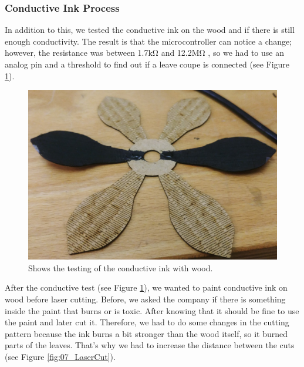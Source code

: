 \documentclass[04.3_buildingProcess.tex]{subfiles}
\begin{document}
    \subsubsection{Conductive Ink Process}
    \begin{flushleft}
        \noindent
        In addition to this, we tested the conductive ink on the wood and if there is 
        still enough conductivity. The result is that the microcontroller can notice a 
        change; however, the resistance was between 1.7k\si{\ohm} and 12.2M\si{\ohm} , 
        so we had to use an analog pin and a threshold to find out if a leave coupe is 
        connected (see Figure \ref{fig:leaveConductiveInk}).

        \begin{figure}[h!]
            \centering
            \includegraphics[scale=0.05]{images/materialProcess/leaveTesting_.jpg}
            \caption{Shows the testing of the conductive ink with wood.}
            \label{fig:leaveConductiveInk}
        \end{figure}

        \noindent
        After the conductive test (see Figure \ref{fig:leaveConductiveInk}), we wanted to paint 
        conductive ink on wood before laser cutting. Before, we asked the company if there is 
        something inside the paint that burns or is toxic. After knowing that it should be fine to 
        use the paint and later cut it. Therefore, we had to do some changes in the cutting pattern
        because the ink burns a bit stronger than the wood itself, so it burned parts of the leaves. 
        That's why we had to increase the distance between the cuts (see Figure \ref{fig:07_LaserCut}). 


\end{flushleft}
\end{document}
